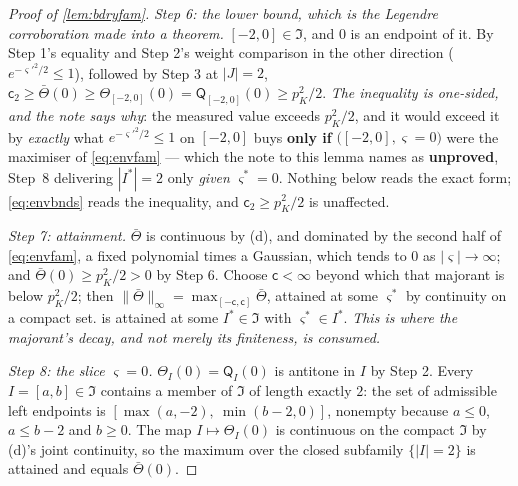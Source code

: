 \begin{proof}[Proof of \cref{lem:bdryfam}]
\emph{Step 6: the lower bound, which is the Legendre corroboration made into a theorem.}
$[-2,0]\in\mathfrak I$, and $0$ is an endpoint of it. By Step 1's equality and Step 2's weight
comparison in the other direction ($e^{-\varsigma'^{2}/2}\le1$), followed by Step 3 at $|J|=2$,
$\mathsf c_2\ge\bar\Theta(0)\ge\Theta_{[-2,0]}(0)=\mathsf Q_{[-2,0]}(0)\ge p_K^{2}/2$.
\emph{The inequality is one-sided, and the note says why}: the measured value exceeds $p_K^{2}/2$, and
it would exceed it by \emph{exactly} what $e^{-\varsigma'^{2}/2}\le1$ on $[-2,0]$ buys \textbf{only if}
$\big([-2,0],\varsigma=0\big)$ were the maximiser of \eqref{eq:envfam} --- which the note to this lemma
names as \textbf{unproved}, Step~8 delivering $|I^\ast|=2$ only \emph{given} $\varsigma^\ast=0$. Nothing
below reads the exact form; \eqref{eq:envbnds} reads the inequality, and
$\mathsf c_2\ge p_K^{2}/2$ is unaffected.

\emph{Step 7: attainment.} $\bar\Theta$ is continuous by \textup{(d)}, and dominated by the second half
of \eqref{eq:envfam}, a fixed polynomial times a Gaussian, which tends to $0$ as $|\varsigma|\to\infty$;
and $\bar\Theta(0)\ge p_K^{2}/2>0$ by Step 6. Choose $\mathsf c<\infty$ beyond which that majorant is below
$p_K^{2}/2$; then $\|\bar\Theta\|_\infty=\max_{[-\mathsf c,\mathsf c]}\bar\Theta$, attained at some
$\varsigma^\ast$ by continuity on a compact set.
is attained at some $I^\ast\in\mathfrak I$ with $\varsigma^\ast\in I^\ast$. \emph{This is where the
majorant's decay, and not merely its finiteness, is consumed.}

\emph{Step 8: the slice $\varsigma=0$.} $\Theta_I(0)=\mathsf Q_I(0)$ is antitone in $I$ by Step 2. Every
$I=[a,b]\in\mathfrak I$ contains a member of $\mathfrak I$ of length exactly $2$: the set of admissible
left endpoints is $[\max(a,-2),\ \min(b-2,0)]$, nonempty because $a\le0$, $a\le b-2$ and $b\ge0$. The map
$I\mapsto\Theta_I(0)$ is continuous on the compact $\mathfrak I$ by \textup{(d)}'s joint continuity, so
the maximum over the closed subfamily $\{|I|=2\}$ is attained and equals $\bar\Theta(0)$.
\end{proof}

